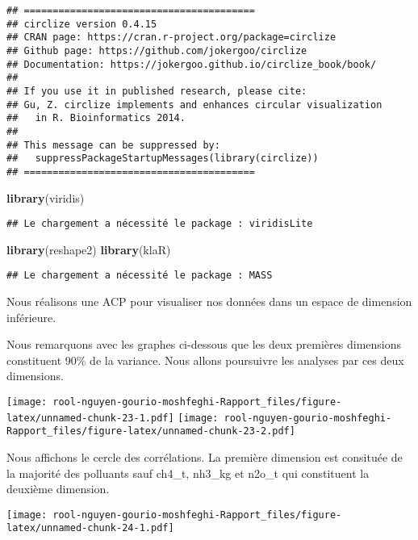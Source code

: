 \documentclass[
]{article}
\newenvironment{Shaded}{\begin{snugshade}}{\end{snugshade}}
\newcommand{\FunctionTok}[1]{\textcolor[rgb]{0.13,0.29,0.53}{\textbf{#1}}}
\newcommand{\NormalTok}[1]{#1}
\begin{document}
\begin{verbatim}
## ========================================
## circlize version 0.4.15
## CRAN page: https://cran.r-project.org/package=circlize
## Github page: https://github.com/jokergoo/circlize
## Documentation: https://jokergoo.github.io/circlize_book/book/
## 
## If you use it in published research, please cite:
## Gu, Z. circlize implements and enhances circular visualization
##   in R. Bioinformatics 2014.
## 
## This message can be suppressed by:
##   suppressPackageStartupMessages(library(circlize))
## ========================================
\end{verbatim}

\begin{Shaded}
\begin{Highlighting}[]
\FunctionTok{library}\NormalTok{(viridis)}
\end{Highlighting}
\end{Shaded}

\begin{verbatim}
## Le chargement a nécessité le package : viridisLite
\end{verbatim}

\begin{Shaded}
\begin{Highlighting}[]
\FunctionTok{library}\NormalTok{(reshape2)}
\FunctionTok{library}\NormalTok{(klaR)}
\end{Highlighting}
\end{Shaded}

\begin{verbatim}
## Le chargement a nécessité le package : MASS
\end{verbatim}

Nous réalisons une ACP pour visualiser nos données dans un espace de
dimension inférieure.

Nous remarquons avec les graphes ci-dessous que les deux premières
dimensions constituent 90\% de la variance. Nous allons poursuivre les
analyses par ces deux dimensions.

\texttt{[image: rool-nguyen-gourio-moshfeghi-Rapport\_files/figure-latex/unnamed-chunk-23-1.pdf]}
\texttt{[image: rool-nguyen-gourio-moshfeghi-Rapport\_files/figure-latex/unnamed-chunk-23-2.pdf]}

Nous affichons le cercle des corrélations. La première dimension est
consituée de la majorité des polluants sauf ch4\_t, nh3\_kg et n2o\_t
qui constituent la deuxième dimension.

\texttt{[image: rool-nguyen-gourio-moshfeghi-Rapport\_files/figure-latex/unnamed-chunk-24-1.pdf]}
\end{document}
